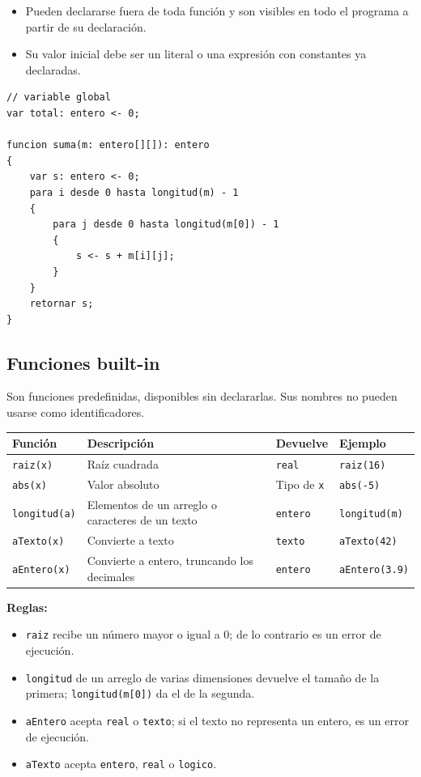 \documentclass[spanish,11pt,letterpaper]{article}
\begin{document}
	\begin{itemize}
		\item Pueden declararse fuera de toda funci\'on y son visibles en todo
		el programa a partir de su declaraci\'on.
		\item Su valor inicial debe ser un literal o una expresi\'on con
		constantes ya declaradas.
	\end{itemize}
	
	\begin{lstlisting}
// variable global
var total: entero <- 0;

funcion suma(m: entero[][]): entero
{
	var s: entero <- 0;
	para i desde 0 hasta longitud(m) - 1
	{
		para j desde 0 hasta longitud(m[0]) - 1
		{
			s <- s + m[i][j];
		}
	}
	retornar s;
}
	\end{lstlisting}
	
	\subsection{Funciones built-in}
	
	Son funciones predefinidas, disponibles sin declararlas. Sus nombres no pueden
	usarse como identificadores.
	
	\begin{center}
		\begin{tabular}{@{}llll@{}}
			\toprule
			\textbf{Funci\'on} & \textbf{Descripci\'on} & \textbf{Devuelve} & \textbf{Ejemplo} \\
			\midrule
			\texttt{raiz(x)} & Ra\'iz cuadrada & \texttt{real} & \texttt{raiz(16)} \\
			\texttt{abs(x)} & Valor absoluto & Tipo de \texttt{x} & \texttt{abs(-5)} \\
			\texttt{longitud(a)} & Elementos de un arreglo o caracteres de un texto & \texttt{entero} & \texttt{longitud(m)} \\
			\texttt{aTexto(x)} & Convierte a texto & \texttt{texto} & \texttt{aTexto(42)} \\
			\texttt{aEntero(x)} & Convierte a entero, truncando los decimales & \texttt{entero} & \texttt{aEntero(3.9)} \\
			\bottomrule
		\end{tabular}
	\end{center}
	
	\textbf{Reglas:}
	\begin{itemize}
		\item \texttt{raiz} recibe un n\'umero mayor o igual a 0; de lo contrario
		es un error de ejecuci\'on.
		\item \texttt{longitud} de un arreglo de varias dimensiones devuelve el
		tama\~no de la primera; \texttt{longitud(m[0])} da el de la segunda.
		\item \texttt{aEntero} acepta \texttt{real} o \texttt{texto}; si el texto
		no representa un entero, es un error de ejecuci\'on.
		\item \texttt{aTexto} acepta \texttt{entero}, \texttt{real} o
		\texttt{logico}.
	\end{itemize}
	
\end{document}
